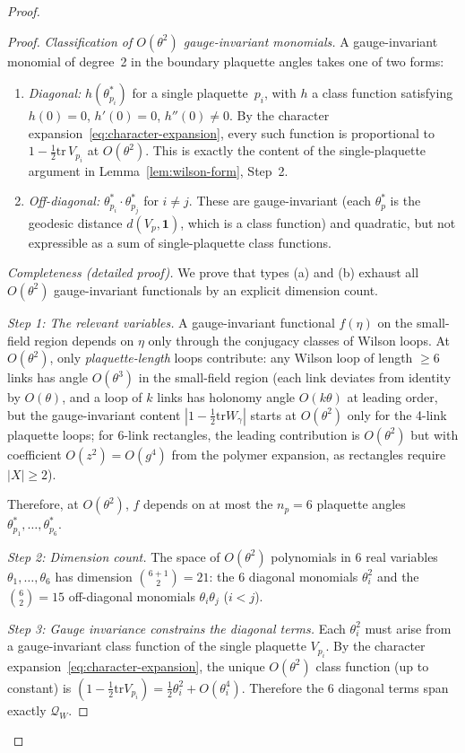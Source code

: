\documentclass[11pt]{article}
\theoremstyle{definition}
\newcommand{\tr}{\mathrm{tr}}
\begin{document}
\begin{proof}
\begin{proof}
\emph{Classification of $O(\theta^2)$ gauge-invariant
monomials.}  A gauge-invariant monomial of degree~2 in the
boundary plaquette angles takes one of two forms:
\begin{enumerate}[nosep,label=(\alph*)]
\item \emph{Diagonal:} $h(\theta_{p_i}^*)$ for a single
plaquette~$p_i$, with $h$ a class function satisfying
$h(0)=0$, $h'(0)=0$, $h''(0)\ne 0$.  By the character
expansion~\eqref{eq:character-expansion}, every such function is
proportional to $1-\frac{1}{2}\tr\,V_{p_i}$ at $O(\theta^2)$.
This is exactly the content of the single-plaquette argument
in Lemma~\ref{lem:wilson-form}, Step~2.
\item \emph{Off-diagonal:}
$\theta_{p_i}^*\cdot\theta_{p_j}^*$ for $i\ne j$.
These are gauge-invariant (each $\theta_p^*$ is the geodesic
distance $d(V_p,\mathbf{1})$, which is a class function) and
quadratic, but not expressible as a sum of
single-plaquette class functions.
\end{enumerate}

\emph{Completeness (detailed proof).}
We prove that types (a) and (b) exhaust all $O(\theta^2)$
gauge-invariant functionals by an explicit dimension count.

\emph{Step 1: The relevant variables.}
A gauge-invariant functional $f(\eta)$ on the small-field
region depends on $\eta$ only through the conjugacy classes
of Wilson loops.  At $O(\theta^2)$, only
\emph{plaquette-length} loops contribute: any Wilson loop
of length $\ge 6$ links has angle $O(\theta^3)$ in the
small-field region (each link deviates from identity by
$O(\theta)$, and a loop of $k$ links has holonomy angle
$O(k\theta)$ at leading order, but the gauge-invariant content
$|1-\frac{1}{2}\tr W_\gamma|$ starts at $O(\theta^2)$ only
for the 4-link plaquette loops; for 6-link rectangles,
the leading contribution is $O(\theta^2)$ but with coefficient
$O(z^2)=O(g^4)$ from the polymer expansion, as rectangles
require $|X|\ge 2$).

Therefore, at $O(\theta^2)$, $f$ depends on at most the
$n_p=6$ plaquette angles $\theta_{p_1}^*,\ldots,\theta_{p_6}^*$.

\emph{Step 2: Dimension count.}
The space of $O(\theta^2)$ polynomials in 6 real variables
$\theta_1,\ldots,\theta_6$ has dimension $\binom{6+1}{2}=21$:
the 6 diagonal monomials $\theta_i^2$ and the
$\binom{6}{2}=15$ off-diagonal monomials $\theta_i\theta_j$
($i<j$).

\emph{Step 3: Gauge invariance constrains the diagonal terms.}
Each $\theta_i^2$ must arise from a gauge-invariant class
function of the single plaquette $V_{p_i}$.  By the
character expansion~\eqref{eq:character-expansion}, the
unique $O(\theta^2)$ class function (up to constant) is
$(1-\frac{1}{2}\tr V_{p_i})=\frac{1}{2}\theta_i^2+O(\theta_i^4)$.
Therefore the 6 diagonal terms span exactly $\mathcal{Q}_W$.


\end{proof}
\end{proof}
\end{document}
